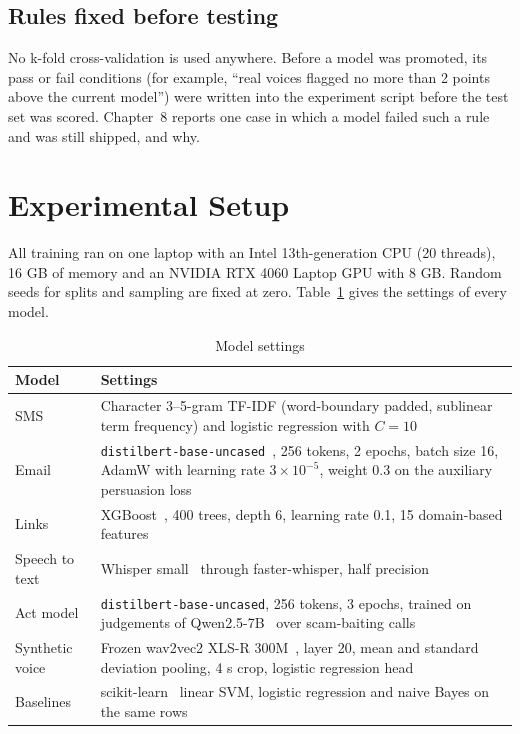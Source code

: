 {\subsection{Rules fixed before testing}
No k-fold cross-validation is used anywhere. Before a model was promoted, its pass or fail conditions (for example, ``real voices flagged no more than 2 points above the current model'') were written into the experiment script before the test set was scored. Chapter~8 reports one case in which a model failed such a rule and was still shipped, and why.

\section{Experimental Setup}
All training ran on one laptop with an Intel 13th-generation CPU (20 threads), 16 GB of memory and an NVIDIA RTX 4060 Laptop GPU with 8 GB. Random seeds for splits and sampling are fixed at zero. Table~\ref{tab:hyper} gives the settings of every model.

\begin{table}[H]
\caption{Model settings}
\label{tab:hyper}
\centering\small{}
\begin{tabular}{|p{2.6cm}|p{11.6cm}|}
\hline
\textbf{Model} & \textbf{Settings} \\ \hline
SMS & Character 3--5-gram TF-IDF (word-boundary padded, sublinear term frequency) and logistic regression with $C=10$ \\ \hline
Email & \texttt{distilbert-base-uncased}~\cite{sanh2019distilbert}, 256 tokens, 2 epochs, batch size 16, AdamW with learning rate $3\times10^{-5}$, weight 0.3 on the auxiliary persuasion loss \\ \hline
Links & XGBoost~\cite{chen2016xgboost}, 400 trees, depth 6, learning rate 0.1, 15 domain-based features \\ \hline
Speech to text & Whisper small~\cite{radford2023whisper} through faster-whisper, half precision \\ \hline
Act model & \texttt{distilbert-base-uncased}, 256 tokens, 3 epochs, trained on judgements of Qwen2.5-7B~\cite{qwen2025} over scam-baiting calls \\ \hline
Synthetic voice & Frozen wav2vec2 XLS-R 300M~\cite{babu2022xlsr}, layer 20, mean and standard deviation pooling, 4 s crop, logistic regression head \\ \hline
Baselines & scikit-learn~\cite{pedregosa2011sklearn} linear SVM, logistic regression and naive Bayes on the same rows \\ \hline
\end{tabular}
\end{table}

}
